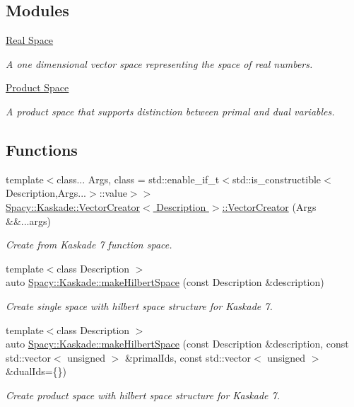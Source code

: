 \subsection*{\-Modules}
\begin{DoxyCompactItemize}
\item 
\hyperlink{group__RealGroup}{\-Real Space}
\begin{DoxyCompactList}\small\item\em \-A one dimensional vector space representing the space of real numbers. \end{DoxyCompactList}\item 
\hyperlink{group__ProductSpaceGroup}{\-Product Space}
\begin{DoxyCompactList}\small\item\em \-A product space that supports distinction between primal and dual variables. \end{DoxyCompactList}\end{DoxyCompactItemize}
\subsection*{\-Functions}
\begin{DoxyCompactItemize}
\item 
{\footnotesize template$<$class... \-Args, class  = std\-::enable\-\_\-if\-\_\-t$<$std\-::is\-\_\-constructible$<$\-Description,\-Args...$>$\-::value$>$$>$ }\\\hyperlink{group__VectorSpaceGroup_ga89de372343310640870077e6167df3f4}{\-Spacy\-::\-Kaskade\-::\-Vector\-Creator$<$ Description $>$\-::\-Vector\-Creator} (\-Args \&\&...args)
\begin{DoxyCompactList}\small\item\em \-Create from \-Kaskade 7 function space. \end{DoxyCompactList}\item 
{\footnotesize template$<$class Description $>$ }\\auto \hyperlink{group__VectorSpaceGroup_ga04d45446864bbf87770d02eade7b64cf}{\-Spacy\-::\-Kaskade\-::make\-Hilbert\-Space} (const \-Description \&description)
\begin{DoxyCompactList}\small\item\em \-Create single space with hilbert space structure for \-Kaskade 7. \end{DoxyCompactList}\item 
{\footnotesize template$<$class Description $>$ }\\auto \hyperlink{group__VectorSpaceGroup_ga221db25c41371a2a823a6b569d735ef6}{\-Spacy\-::\-Kaskade\-::make\-Hilbert\-Space} (const \-Description \&description, const std\-::vector$<$ unsigned $>$ \&primal\-Ids, const std\-::vector$<$ unsigned $>$ \&dual\-Ids=\{\})
\begin{DoxyCompactList}\small\item\em \-Create product space with hilbert space structure for \-Kaskade 7. \end{DoxyCompactList}\end{DoxyCompactItemize}


